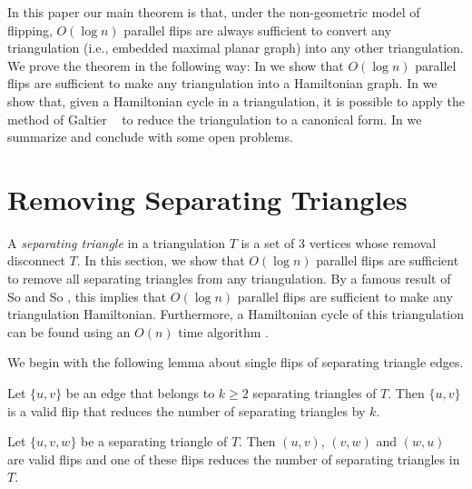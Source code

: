 \documentclass{article}
\begin{document}
In this paper our main theorem is that, under the non-geometric model
of flipping, $O(\log n)$ parallel flips are always sufficient to
convert any triangulation (i.e., embedded maximal planar graph) into
any other triangulation.  We prove the theorem in the following way:
In  we show that $O(\log n)$ parallel flips are
sufficient to make any triangulation into a Hamiltonian graph.  In
 we show that, given a Hamiltonian cycle in a
triangulation, it is possible to apply the method of Galtier \etal\
\cite{gxxXX} to reduce the triangulation to a canonical form.  In
\secref{conclusions} we summarize and conclude with some open
problems.

\section{Removing Separating Triangles}

A \emph{separating triangle} in a triangulation $T$ is a set of 3
vertices whose removal disconnect $T$.  In this section, we show that
$O(\log n)$ parallel flips are sufficient to remove all separating
triangles from any triangulation.  By a famous result of So and So
\cite{XX}, this implies that $O(\log n)$ parallel flips are sufficient
to make any triangulation Hamiltonian.  Furthermore, a Hamiltonian
cycle of this triangulation can be found using an $O(n)$ time
algorithm \cite{XX}.

We begin with the following lemma about single flips of separating
triangle edges.

\begin{lem}
Let $\{u,v\}$ be an edge that belongs to $k\ge 2$ separating triangles
of $T$.  Then $\{u,v\}$ is a valid flip that reduces the number of
separating triangles by $k$.
\end{lem}

\begin{lem}
Let $\{u,v,w\}$ be a separating triangle of $T$.  Then $(u,v)$,
$(v,w)$ and $(w,u)$ are valid flips and one of these flips reduces the
number of separating triangles in $T$.
\end{lem}
\end{document}
